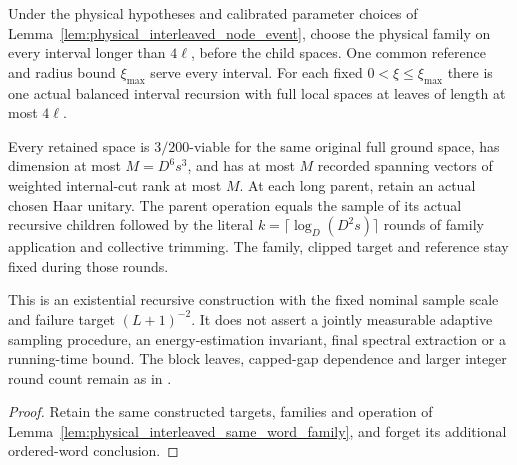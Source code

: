 \begin{lemma}
    \label{lem:physical_interleaved_tree}
    \leanok
    Under the physical hypotheses and calibrated parameter choices of
    Lemma~\ref{lem:physical_interleaved_node_event}, choose the physical
    family on every interval longer than $4\ell$, before the child spaces.
    One common reference and radius bound $\xi_{\max}$ serve every
    interval. For each fixed $0<\xi\le\xi_{\max}$ there is one actual
    balanced interval recursion with full local spaces at leaves of
    length at most $4\ell$.

    Every retained space is $3/200$-viable for the same original full
    ground space, has dimension at most $M=D^6s^3$, and has at most $M$
    recorded spanning vectors of weighted internal-cut rank at most $M$.
    At each long parent, retain an actual chosen Haar unitary. The parent
    operation equals the sample of its actual recursive children followed
    by the literal $k=\lceil\log_D(D^2s)\rceil$ rounds of family application
    and collective trimming. The family, clipped target and reference
    stay fixed during those rounds.

    This is an existential recursive construction with the fixed nominal
    sample scale and failure target $(L+1)^{-2}$. It does not assert a
    jointly measurable adaptive sampling procedure, an energy-estimation
    invariant, final spectral extraction or a running-time bound. The
    block leaves, capped-gap dependence and larger integer round count
    remain as in \cite{gap:alvv16_approximation_parameters}.
\end{lemma}
\begin{proof}\leanok
    Retain the same constructed targets, families and operation of
    Lemma~\ref{lem:physical_interleaved_same_word_family}, and forget
    its additional ordered-word conclusion.
\end{proof}


